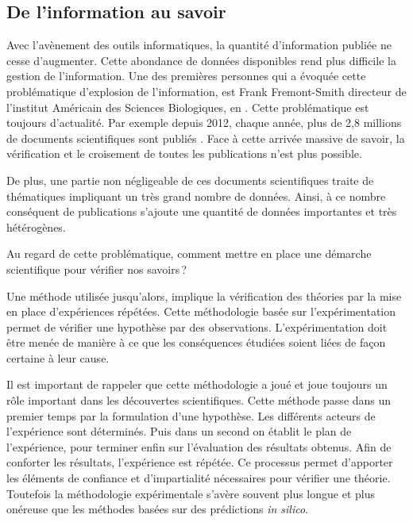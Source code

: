 \begin{refsegment}
\chapter*{De l'information au savoir}
Avec l'avènement des outils informatiques, la quantité d'information publiée ne cesse d'augmenter. Cette abondance de données disponibles rend plus difficile la gestion de l'information. Une des premières personnes qui a évoquée cette problématique d'explosion de l'information, est Frank Fremont-Smith directeur de l'institut Américain des Sciences Biologiques,  en \citeyear{fremont61}  \cite{fremont61}. Cette problématique est toujours d'actualité. Par exemple depuis 2012, chaque année, plus de 2,8 millions de documents scientifiques sont publiés  \cite{oecd2016} . Face à cette arrivée massive de savoir, la vérification et le croisement de toutes les publications n'est plus possible.

De plus, une partie non négligeable de ces documents scientifiques traite de thématiques impliquant un très grand nombre de données. Ainsi, à ce nombre conséquent de publications s'ajoute une quantité de données importantes et très hétérogènes.

Au regard de cette problématique, comment mettre en place une démarche scientifique pour vérifier nos savoirs ?

Une méthode utilisée jusqu'alors, implique la vérification des théories par la mise en place d'expériences répétées. Cette méthodologie basée sur l'expérimentation permet de vérifier une hypothèse par des observations. L'expérimentation doit être menée de manière à ce que les conséquences étudiées soient liées de façon certaine à leur cause.

Il est important de rappeler que cette méthodologie a joué et joue toujours un rôle important dans les découvertes scientifiques. Cette méthode passe dans un premier temps par la formulation d'une hypothèse. Les différents acteurs de l'expérience sont déterminés. Puis dans un second on établit le plan de l'expérience, pour terminer enfin sur l'évaluation des résultats obtenus. Afin de conforter les résultats, l'expérience est répétée. Ce processus permet d'apporter les éléments de confiance et d'impartialité nécessaires pour vérifier une théorie. Toutefois la méthodologie expérimentale s'avère souvent plus longue et plus onéreuse que les méthodes basées sur des prédictions \textit{in silico}. 


\end{refsegment}
